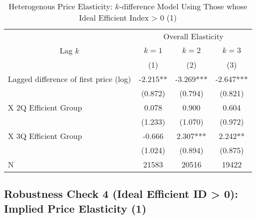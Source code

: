 \documentclass[ review  , 3p ]{elsarticle}
\begin{document}
  \begin{table}
  
  \caption{\label{tab:kableSubsetHeterokDiffElasticitySlide1}Heterogenous Price Elasticity: $k$-difference Model Using Those whose Ideal Efficient Index > 0 (1)}
  \centering
  \fontsize{8}{10}\selectfont
  \begin{tabular}[t]{lccc}
  \toprule
  \multicolumn{1}{c}{ } & \multicolumn{3}{c}{Overall Elasticity} \\
  \cmidrule(l{3pt}r{3pt}){2-4}
  \multicolumn{1}{c}{Lag $k$} & \multicolumn{1}{c}{$k = 1$} & \multicolumn{1}{c}{$k = 2$} & \multicolumn{1}{c}{$k = 3$} \\
  \cmidrule(l{3pt}r{3pt}){1-1} \cmidrule(l{3pt}r{3pt}){2-2} \cmidrule(l{3pt}r{3pt}){3-3} \cmidrule(l{3pt}r{3pt}){4-4}
   & (1) & (2) & (3)\\
  \midrule
  Lagged difference of first price (log) & -2.215** & -3.269*** & -2.647***\\
   & (0.872) & (0.794) & (0.821)\\
  \hspace{1em}X 2Q Efficient Group & 0.078 & 0.900 & 0.604\\
   & (1.233) & (1.070) & (0.972)\\
  \hspace{1em}X 3Q Efficient Group & -0.666 & 2.307*** & 2.242**\\
   & (1.024) & (0.894) & (0.875)\\
  N & 21583 & 20516 & 19422\\
  \bottomrule
  \end{tabular}
  \end{table}
  
  \hypertarget{robustness-check-4-ideal-efficient-id-0-implied-price-elasticity-1}{%
  \subsection{Robustness Check 4 (Ideal Efficient ID \textgreater{} 0): Implied Price Elasticity (1)}\label{robustness-check-4-ideal-efficient-id-0-implied-price-elasticity-1}}
  
\end{document}
